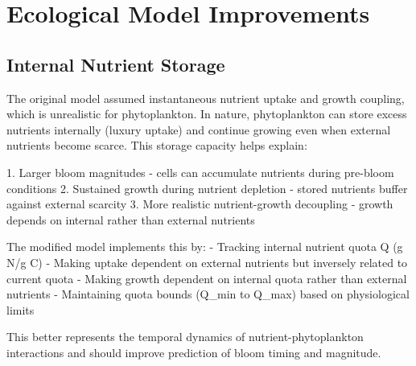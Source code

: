 \section{Ecological Model Improvements}

\subsection{Internal Nutrient Storage}

The original model assumed instantaneous nutrient uptake and growth coupling, which is unrealistic for phytoplankton. In nature, phytoplankton can store excess nutrients internally (luxury uptake) and continue growing even when external nutrients become scarce. This storage capacity helps explain:

1. Larger bloom magnitudes - cells can accumulate nutrients during pre-bloom conditions
2. Sustained growth during nutrient depletion - stored nutrients buffer against external scarcity
3. More realistic nutrient-growth decoupling - growth depends on internal rather than external nutrients

The modified model implements this by:
- Tracking internal nutrient quota Q (g N/g C)
- Making uptake dependent on external nutrients but inversely related to current quota
- Making growth dependent on internal quota rather than external nutrients
- Maintaining quota bounds (Q_min to Q_max) based on physiological limits

This better represents the temporal dynamics of nutrient-phytoplankton interactions and should improve prediction of bloom timing and magnitude.
